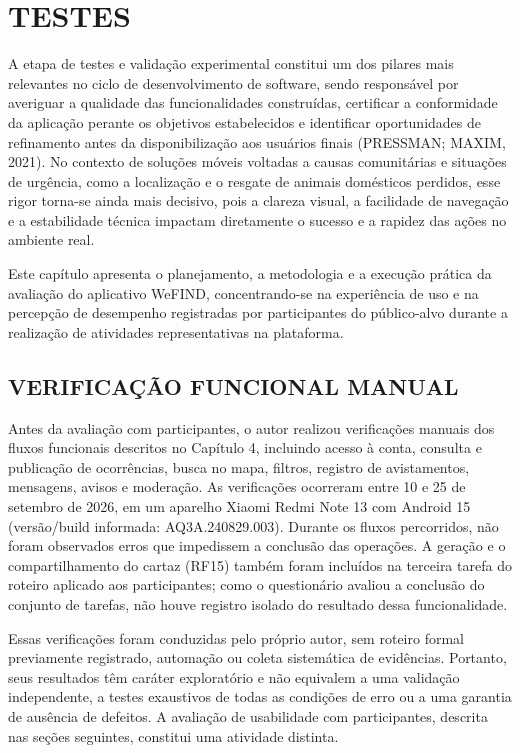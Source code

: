 \section{TESTES}
\setcounter{quadro}{4}

A etapa de testes e validação experimental constitui um dos pilares mais relevantes no ciclo de desenvolvimento de software, sendo responsável por averiguar a qualidade das funcionalidades construídas, certificar a conformidade da aplicação perante os objetivos estabelecidos e identificar oportunidades de refinamento antes da disponibilização aos usuários finais (PRESSMAN; MAXIM, 2021). No contexto de soluções móveis voltadas a causas comunitárias e situações de urgência, como a localização e o resgate de animais domésticos perdidos, esse rigor torna-se ainda mais decisivo, pois a clareza visual, a facilidade de navegação e a estabilidade técnica impactam diretamente o sucesso e a rapidez das ações no ambiente real.

Este capítulo apresenta o planejamento, a metodologia e a execução prática da avaliação do aplicativo WeFIND, concentrando-se na experiência de uso e na percepção de desempenho registradas por participantes do público-alvo durante a realização de atividades representativas na plataforma.

\subsection{VERIFICAÇÃO FUNCIONAL MANUAL}

Antes da avaliação com participantes, o autor realizou verificações manuais dos fluxos funcionais descritos no Capítulo 4, incluindo acesso à conta, consulta e publicação de ocorrências, busca no mapa, filtros, registro de avistamentos, mensagens, avisos e moderação. As verificações ocorreram entre 10 e 25 de setembro de 2026, em um aparelho Xiaomi Redmi Note 13 com Android 15 (versão/build informada: AQ3A.240829.003). Durante os fluxos percorridos, não foram observados erros que impedissem a conclusão das operações. A geração e o compartilhamento do cartaz (RF15) também foram incluídos na terceira tarefa do roteiro aplicado aos participantes; como o questionário avaliou a conclusão do conjunto de tarefas, não houve registro isolado do resultado dessa funcionalidade.

Essas verificações foram conduzidas pelo próprio autor, sem roteiro formal previamente registrado, automação ou coleta sistemática de evidências. Portanto, seus resultados têm caráter exploratório e não equivalem a uma validação independente, a testes exaustivos de todas as condições de erro ou a uma garantia de ausência de defeitos. A avaliação de usabilidade com participantes, descrita nas seções seguintes, constitui uma atividade distinta.

